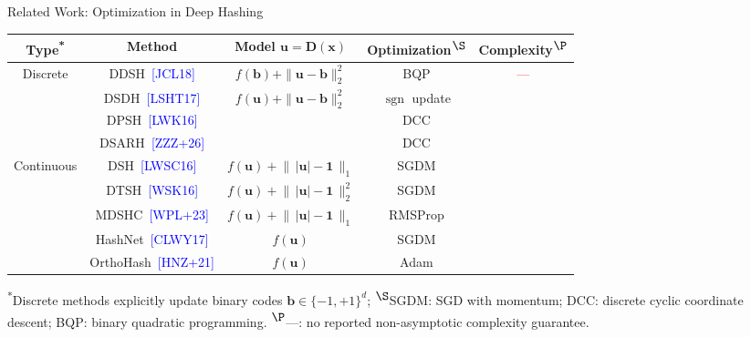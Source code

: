 \documentclass[mathserif,compress,override,9pt]{beamer}
\numberwithin{equation}{section}
\newcommand{\One}{\bm{1}}
\newcommand{\bx}{\bm{x}}
\newcommand{\bb}{\bm{b}}
\newcommand{\bu}{\bm{u}}
\newcommand{\bD}{\bm{D}}
\newcommand{\blue}[1]{\textcolor{blue}{#1}}
\newcommand{\red}[1]{\textcolor{red}{#1}}
\theoremstyle{remark}
\begin{document}
\begin{frame}{Related Work: Optimization in Deep Hashing}
\vfill
\vspace{-0.2cm}

\begin{center}
{\footnotesize
\begin{tabular}{ccccc}
\toprule
\textbf{Type}\textsuperscript{*}
& \textbf{Method}
& \makecell{\textbf{Model}\\ $\bu=\bD(\bx)$}
& \textbf{Optimization}\textsuperscript{\(\S\)}
& \textbf{Complexity}\textsuperscript{\(\P\)} \\
\midrule
\multirow{4}{*}{Discrete}
& DDSH~\blue{[JCL18]} & $f(\bb)+\|\bu-\bb\|_2^2$ & BQP & \multirow{9}{*}{\red{---}} \\
& DSDH~\blue{[LSHT17]} & \multirow{3}{*}{$f(\bu)+\|\bu-\bb\|_2^2$} & $\operatorname{sgn}$ update & \\
& DPSH~\blue{[LWK16]} & & DCC & \\
& DSARH~\blue{[ZZZ+26]} & & DCC & \\
\cmidrule(lr){1-4}
\multirow{5}{*}{Continuous}
& DSH~\blue{[LWSC16]} & $f(\bu)+\bigl\|\,|\bu|-\One\,\bigr\|_1$ & SGDM & \\
& DTSH~\blue{[WSK16]} & $f(\bu)+\bigl\|\,|\bu|-\One\,\bigr\|_2^2$ & SGDM & \\
& MDSHC~\blue{[WPL+23]} & $f(\bu)+\bigl\|\,|\bu|-\One\,\bigr\|_1$ & RMSProp & \\
\cmidrule(lr){2-4}
& HashNet~\blue{[CLWY17]} & $f(\bu)$ & SGDM & \\
& OrthoHash~\blue{[HNZ+21]} & $f(\bu)$ & Adam & \\
\bottomrule
\end{tabular}}
\end{center}

\vspace{0.08cm}
\textsuperscript{*}Discrete methods explicitly update binary codes \(\bb\in\{-1,+1\}^d\);
\textsuperscript{\(\S\)}SGDM: SGD with momentum; DCC: discrete cyclic coordinate descent; BQP: binary quadratic programming.
\textsuperscript{\(\P\)}---: no reported non-asymptotic complexity guarantee.
\vfill
\end{frame}
\end{document}
